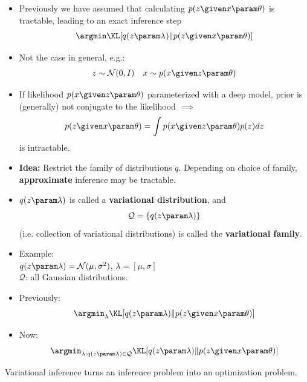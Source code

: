 \begin{frame}
\begin{center}
\end{center}
\begin{itemize}
    \item Previously we have assumed that calculating $p(z \given x \param \theta)$ is tractable, leading to an exact inference step
    \[ \argmin \KL[q(z \param \lambda^{}) \Vert p( z \given x \param \theta)]\]
    \item Not the case in general, e.g.:
     \begin{align*}
         z \sim \mathcal{N}(0, I) && x \sim p(x \given z \param \theta)
     \end{align*}
     \item If likelihood $p(x \given z \param \theta)$ parameterized with a deep model, prior      is (generally) not conjugate to the likelihood $\implies$ 
    \[ p(z \given x \param \theta) = \int p(x \given z \param \theta) p(z) dz \] 
    is intractable.
\end{itemize}
\end{frame}
\begin{frame}
\begin{itemize}
\item \textbf{Idea:} Restrict the family of distributions $q$.
Depending on choice of family, \textbf{approximate} inference may be tractable.
\item $q(z \param \lambda)$ is called a \textbf{variational distribution}, and 
\[ \mathcal{Q} = \{ q(z \param \lambda)\} \] 
(i.e. collection of variational distributions) is called the \textbf{variational family}.
\item Example: \\
$q(z \param \lambda) = \mathcal{N}(\mu, \sigma^2)$, $\lambda = [\mu, \sigma]$ \\
$\mathcal{Q}$: all Gaussian distributions.
\end{itemize}
\end{frame}

\begin{frame}
\begin{itemize}
    \item Previously:
    \[ \argmin_\lambda \KL [q(z \param \lambda) \Vert p(z \given x \param \theta)]\]
    \item Now:
    \[ \argmin_{\lambda : q(z\param \lambda) \in \mathcal{Q}} \KL [q(z \param \lambda) \Vert p(z \given x \param \theta)]\]
\end{itemize}
Variational inference turns an inference problem into an optimization problem.
\end{frame}

